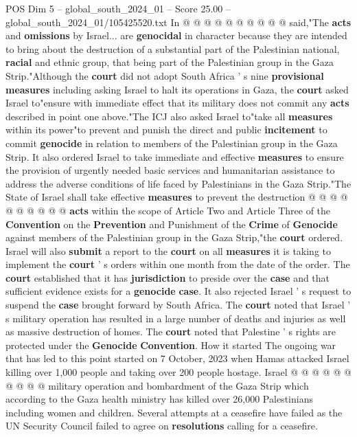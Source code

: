 \begin{textsample}{POS Dim 5 – global\_south\_2024\_01 – Score 25.00 – global\_south\_2024\_01/105425520.txt}
In @ @ @ @ @ @ @ @ @ @ said,"The \textbf{acts} and \textbf{omissions} by Israel... are \textbf{genocidal} in character because they are intended to bring about the destruction of a substantial part of the Palestinian national, \textbf{racial} and ethnic group, that being part of the Palestinian group in the Gaza Strip."Although the \textbf{court} did not adopt South Africa ' s nine \textbf{provisional} \textbf{measures} including asking Israel to halt its operations in Gaza, the \textbf{court} asked Israel to"ensure with immediate effect that its military does not commit any \textbf{acts} described in point one above."The ICJ also asked Israel to"take all \textbf{measures} within its power"to prevent and punish the direct and public \textbf{incitement} to commit \textbf{genocide} in relation to members of the Palestinian group in the Gaza Strip.
It also ordered Israel to take immediate and effective \textbf{measures} to ensure the provision of urgently needed basic services and humanitarian assistance to address the adverse conditions of life faced by Palestinians in the Gaza Strip."The State of Israel shall take effective \textbf{measures} to prevent the destruction @ @ @ @ @ @ @ @ @ @ \textbf{acts} within the scope of Article Two and Article Three of the \textbf{Convention} on the \textbf{Prevention} and Punishment of the \textbf{Crime} of \textbf{Genocide} against members of the Palestinian group in the Gaza Strip,"the \textbf{court} ordered.
Israel will also \textbf{submit} a report to the \textbf{court} on all \textbf{measures} it is taking to implement the \textbf{court} ' s orders within one month from the date of the order.
The \textbf{court} established that it has \textbf{jurisdiction} to preside over the \textbf{case} and that sufficient evidence exists for a \textbf{genocide} \textbf{case}.
It also rejected Israel ' s request to suspend the \textbf{case} brought forward by South Africa.
The \textbf{court} noted that Israel ' s military operation has resulted in a large number of deaths and injuries as well as massive destruction of homes.
The \textbf{court} noted that Palestine ' s rights are protected under the \textbf{Genocide} \textbf{Convention}.
How it started The ongoing war that has led to this point started on 7 October, 2023 when Hamas attacked Israel killing over 1,000 people and taking over 200 people hostage.
Israel @ @ @ @ @ @ @ @ @ @ military operation and bombardment of the Gaza Strip which according to the Gaza health ministry has killed over 26,000 Palestinians including women and children.
Several attempts at a ceasefire have failed as the UN Security Council failed to agree on \textbf{resolutions} calling for a ceasefire.

\end{textsample}
